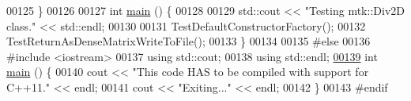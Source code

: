 \begin{DoxyCode}
00125 \}
00126 
00127 \textcolor{keywordtype}{int} \hyperlink{mtk__div__2d__test_8cc_ae66f6b31b5ad750f1fe042a706a4e3d4}{main} () \{
00128 
00129   std::cout << \textcolor{stringliteral}{"Testing mtk::Div2D class."} << std::endl;
00130 
00131   TestDefaultConstructorFactory();
00132   TestReturnAsDenseMatrixWriteToFile();
00133 \}
00134 
00135 \textcolor{preprocessor}{#else}
00136 \textcolor{preprocessor}{#include <iostream>}
00137 \textcolor{keyword}{using} std::cout;
00138 \textcolor{keyword}{using} std::endl;
\hypertarget{mtk__div__2d__test_8cc_source_l00139}{}\hyperlink{mtk__div__2d__test_8cc_ae66f6b31b5ad750f1fe042a706a4e3d4}{00139} \textcolor{keywordtype}{int} \hyperlink{mtk__div__2d__test_8cc_ae66f6b31b5ad750f1fe042a706a4e3d4}{main} () \{
00140   cout << \textcolor{stringliteral}{"This code HAS to be compiled with support for C++11."} << endl;
00141   cout << \textcolor{stringliteral}{"Exiting..."} << endl;
00142 \}
00143 \textcolor{preprocessor}{#endif}
\end{DoxyCode}

